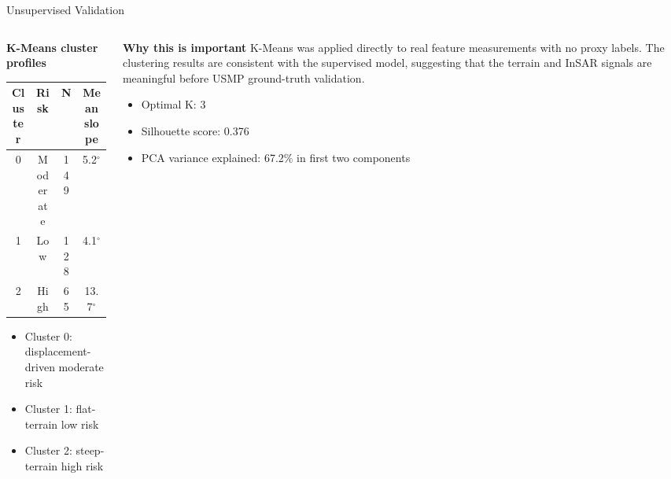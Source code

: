 \documentclass[aspectratio=169,11pt]{beamer}
\newcommand{\slideheading}[1]{\vspace{0.05cm}\textbf{#1}\vspace{0.12cm}}
\begin{document}
\begin{frame}{Unsupervised Validation}
\begin{columns}[T,onlytextwidth]
\begin{column}{0.48\textwidth}
\slideheading{K-Means cluster profiles}
\scriptsize
\begin{tabular}{cccc}
\toprule
\textbf{Cluster} & \textbf{Risk} & \textbf{N} & \textbf{Mean slope} \\
\midrule
0 & Moderate & 149 & 5.2$^\circ$ \\
1 & Low & 128 & 4.1$^\circ$ \\
2 & High & 65 & 13.7$^\circ$ \\
\bottomrule
\end{tabular}
\vspace{0.25cm}
\begin{itemize}\setlength\itemsep{0.25em}\footnotesize
  \item Cluster 0: displacement-driven moderate risk
  \item Cluster 1: flat-terrain low risk
  \item Cluster 2: steep-terrain high risk
\end{itemize}
\end{column}
\begin{column}{0.48\textwidth}
\slideheading{Why this is important}
\footnotesize
K-Means was applied directly to real feature measurements with no proxy labels. The clustering results are consistent with the supervised model, suggesting that the terrain and InSAR signals are meaningful before USMP ground-truth validation.
\vspace{0.25cm}
\begin{itemize}\setlength\itemsep{0.25em}
  \item Optimal K: 3
  \item Silhouette score: 0.376
  \item PCA variance explained: 67.2\% in first two components
\end{itemize}
\end{column}
\end{columns}
\end{frame}
\end{document}
